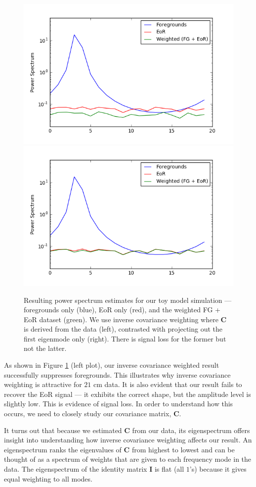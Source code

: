 \documentclass[preprint2,numberedappendix,tighten,twocolappendix]{aastex6}  %
\begin{document}
\begin{figure}
	\centering
	\includegraphics[trim={0.3cm 0.2cm 1cm 0.3cm},clip,height=0.3\textwidth]{plots/toy_sigloss3.png}
	\includegraphics[trim={1cm 0.2cm 0cm 0.3cm},clip,height=0.3\textwidth]{plots/toy_sigloss4.png}
	\caption{Resulting power spectrum estimates for our toy model simulation --- foregrounds only (blue), EoR only (red), and the weighted FG + EoR dataset (green). We use inverse covariance weighting where $\textbf{C}$ is derived from the data (left), contrasted with projecting out the first eigenmode only (right). There is signal loss for the former but not the latter.}
	\label{fig:toy_sigloss3}
\end{figure}

As shown in Figure \ref{fig:toy_sigloss3} (left plot), our inverse covariance weighted result successfully suppresses foregrounds. This illustrates why inverse covariance weighting is attractive for $21$ cm data. It is also evident that our result fails to recover the EoR signal --- it exhibits the correct shape, but the amplitude level is slightly low. This is evidence of signal loss. In order to understand how this occurs, we need to closely study our covariance matrix, $\textbf{C}$.

It turns out that because we estimated $\textbf{C}$ from our data, its eigenspectrum offers insight into understanding how inverse covariance weighting affects our result. An eigenspectrum ranks the eigenvalues of $\textbf{C}$ from highest to lowest and can be thought of as a spectrum of weights that are given to each frequency mode in the data. The eigenspectrum of the identity matrix $\textbf{I}$ is flat (all $1$'s) because it gives equal weighting to all modes. 
\end{document}
